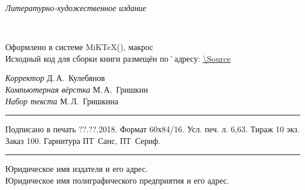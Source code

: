 ﻿\clearpage

\thispagestyle{empty}
\noindent\begin{center}
	{\itshape Литературно-художественное издание\par}
\end{center}	
\vfill\noindent
\begin{center}
	{\large{\bfseries\MakeUppercase{\AuthorFam}} \AuthorName\\[3ex]}	
	{\LARGE\Title}
\end{center}

\vfill\noindent
\begin{center}
	Оформлено в системе MiK\TeX(\LaTeXe), макрос \KOMAScript\\[1ex]
	Исходный код для сборки книги размещён по˚адресу: \footnotesize\url{\Source}
\end{center}
	
\vfill\noindent
\begin{center}
	\small 
	{\itshape Корректор} Д.\,А.~Кулебянов\\[1ex]
	{\itshape Компьютерная вёрстка} М.\,А.~Гришкин\\[1ex]
	{\itshape Набор текста} М.\,Л.~Гришкина\\[1ex]
\end{center}

\vfill\noindent
\rule{\textwidth}{.5pt}
\begin{center}
	\small Подписано в печать  ??.??.2018. Формат 60х84/16. Усл. печ. л. 6,63. Тираж 10 экз. Заказ 100. Гарнитура ПТ~Санс, ПТ~Сериф.		
\end{center}
\rule{\textwidth}{.5pt}

\vfil\noindent		
\begin{center}
		\small
		
		Юридическое имя издателя и его адрес.\\[1ex]
				
		Юридическое имя полиграфического предприятия и его адрес.
\end{center}

